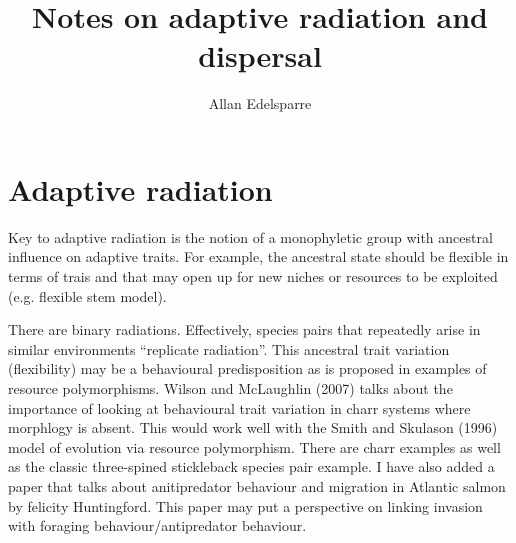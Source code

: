 \documentclass[11pt]{article}
\title{\textbf{Notes on adaptive radiation and dispersal}}
\author{Allan Edelsparre}
\date{}
\begin{document}
\maketitle

\section{Adaptive radiation}

Key to adaptive radiation is the notion of a monophyletic group with ancestral influence on adaptive traits. For example, the ancestral state should be flexible in terms of trais and that may open up for new niches or resources to be exploited (e.g. flexible stem model).

There are binary radiations. Effectively, species pairs that repeatedly arise in similar environments ``replicate radiation''. This ancestral trait variation (flexibility) may be a behavioural predisposition as is proposed in examples of resource polymorphisms. Wilson and McLaughlin (2007) talks about the importance of looking at behavioural trait variation in charr systems where morphlogy is absent. This would work well with the Smith and Skulason (1996) model of evolution via resource polymorphism. There are charr examples as well as the classic three-spined stickleback species pair example. I have also added a paper that talks about anitipredator behaviour and migration in Atlantic salmon by felicity Huntingford. This paper may put a perspective on linking invasion with foraging behaviour/antipredator behaviour. 
\end{document}
